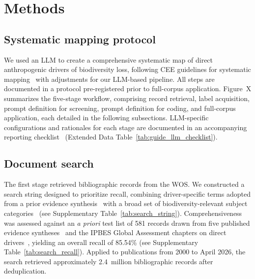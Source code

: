 \documentclass[12pt]{article}
\newcommand{\TODO}[1]{{\color{red}#1}}
\begin{document}
\newpage
\section*{Methods}
\subsection*{Systematic mapping protocol}
We used an LLM to create a comprehensive systematic map of direct anthropogenic drivers of biodiversity loss, following CEE guidelines for systematic mapping~\cite{CEE_Guidelines_5_1_2022} with adjustments for our LLM-based pipeline. All steps are documented in a protocol pre-registered prior to full-corpus application. Figure~\TODO{X} summarizes the five-stage workflow, comprising record retrieval, label acquisition, prompt definition for screening, prompt definition for coding, and full-corpus application, each detailed in the following subsections. LLM-specific configurations and rationales for each stage are documented in an accompanying reporting checklist~\cite{feuerriegel_reporting_2026} (Extended Data Table~\ref{tab:guide_llm_checklist}).

\subsection*{Document search}
The first stage retrieved bibliographic records from the WOS. We constructed a search string designed to prioritize recall, combining driver-specific terms adopted from a prior evidence synthesis~\cite{jaureguiberry_direct_2022} with a broad set of biodiversity-relevant subject categories~\cite{moullec_identifying_2021} (see Supplementary Table~\ref{tab:search_string}). Comprehensiveness was assessed against an \emph{a priori} test list of 581 records drawn from five published evidence syntheses~\cite{moullec_identifying_2021, jaureguiberry_direct_2022, beckmann_conventional_2019, benitez-lopez_impact_2017, urban_accelerating_2015} and the IPBES Global Assessment chapters on direct drivers~\cite{balvanera_chapter_2019}, yielding an overall recall of 85.54\% (see Supplementary Table~\ref{tab:search_recall}). Applied to publications from 2000 to April 2026, the search retrieved approximately 2.4~million bibliographic records after deduplication.
\end{document}
